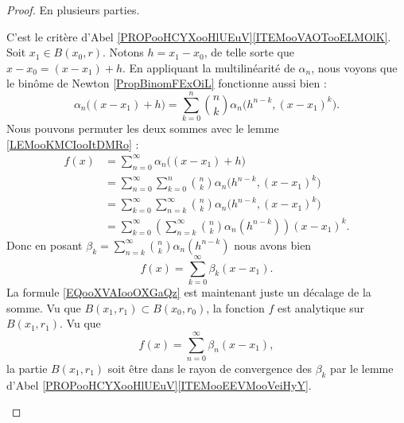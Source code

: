 \begin{proof}
	En plusieurs parties.
	\begin{subproof}
		C'est le critère d'Abel \ref{PROPooHCYXooHlUEuV}\ref{ITEMooVAOTooELMOlK}.
		Soit \( x_1\in B(x_0,r)\). Notons \( h=x_1-x_0\), de telle sorte que \( x-x_0=(x-x_1)+h\). En appliquant la multilinéarité de \( \alpha_n\), nous voyons que le binôme de Newton \ref{PropBinomFExOiL} fonctionne aussi bien :
		\begin{equation}
			\alpha_n\big( (x-x_1)+h \big)=\sum_{k=0}^n\binom{ n }{ k }\alpha_n\big( h^{n-k},(x-x_1)^k \big).
		\end{equation}
		Nous pouvons permuter les deux sommes avec le lemme \ref{LEMooKMCIooItDMRo} :
		\begin{subequations}
			\begin{align}
				f(x) & =\sum_{n=0}^{\infty}\alpha_n\big( (x-x_1)+h \big)                                                 \\
				     & =\sum_{n=0}^{\infty}\sum_{k=0}^n\binom{ n }{ k }\alpha_n\big( h^{n-k},(x-x_1)^k \big)             \\
				     & =\sum_{k=0}^{\infty}\sum_{n=k}^{\infty}\binom{ n }{ k }\alpha_n\big( h^{n-k},(x-x_1)^k \big)      \\
				     & =\sum_{k=0}^{\infty}\left( \sum_{n=k}^{\infty}\binom{ n }{ k }\alpha_n(h^{n-k}) \right)(x-x_1)^k.
			\end{align}
		\end{subequations}
		Donc en posant \( \beta_k=\sum_{n=k}^{\infty}\binom{ n }{ k }\alpha_n(h^{n-k})\) nous avons bien
		\begin{equation}
			f(x)=\sum_{k=0}^{\infty}\beta_k(x-x_1).
		\end{equation}
		La formule \eqref{EQooXVAIooOXGaQz} est maintenant juste un décalage de la somme.
		Vu que \( B(x_1,r_1)\subset B(x_0,r_0)\), la fonction \( f\) est analytique sur \( B(x_1,r_1)\). Vu que
		\begin{equation}
			f(x)=\sum_{n=0}^{\infty}\beta_n(x-x_1),
		\end{equation}
		la partie \( B(x_1,r_1)\) soit être dans le rayon de convergence des \( \beta_k\) par le lemme d'Abel \ref{PROPooHCYXooHlUEuV}\ref{ITEMooEEVMooVeiHyY}.
	\end{subproof}
\end{proof}

